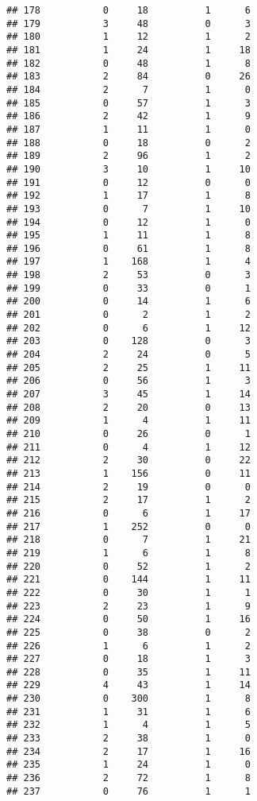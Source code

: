 \documentclass[]{article}
\begin{document}
\begin{verbatim}
## 178           0     18          1      6
## 179           3     48          0      3
## 180           1     12          1      2
## 181           1     24          1     18
## 182           0     48          1      8
## 183           2     84          0     26
## 184           2      7          1      0
## 185           0     57          1      3
## 186           2     42          1      9
## 187           1     11          1      0
## 188           0     18          0      2
## 189           2     96          1      2
## 190           3     10          1     10
## 191           0     12          0      0
## 192           1     17          1      8
## 193           0      7          1     10
## 194           0     12          1      0
## 195           1     11          1      8
## 196           0     61          1      8
## 197           1    168          1      4
## 198           2     53          0      3
## 199           0     33          0      1
## 200           0     14          1      6
## 201           0      2          1      2
## 202           0      6          1     12
## 203           0    128          0      3
## 204           2     24          0      5
## 205           2     25          1     11
## 206           0     56          1      3
## 207           3     45          1     14
## 208           2     20          0     13
## 209           1      4          1     11
## 210           0     26          0      1
## 211           0      4          1     12
## 212           2     30          0     22
## 213           1    156          0     11
## 214           2     19          0      0
## 215           2     17          1      2
## 216           0      6          1     17
## 217           1    252          0      0
## 218           0      7          1     21
## 219           1      6          1      8
## 220           0     52          1      2
## 221           0    144          1     11
## 222           0     30          1      1
## 223           2     23          1      9
## 224           0     50          1     16
## 225           0     38          0      2
## 226           1      6          1      2
## 227           0     18          1      3
## 228           0     35          1     11
## 229           4     43          1     14
## 230           0    300          1      8
## 231           1     31          1      6
## 232           1      4          1      5
## 233           2     38          1      0
## 234           2     17          1     16
## 235           1     24          1      0
## 236           2     72          1      8
## 237           0     76          1      1

\end{verbatim}
\end{document}
